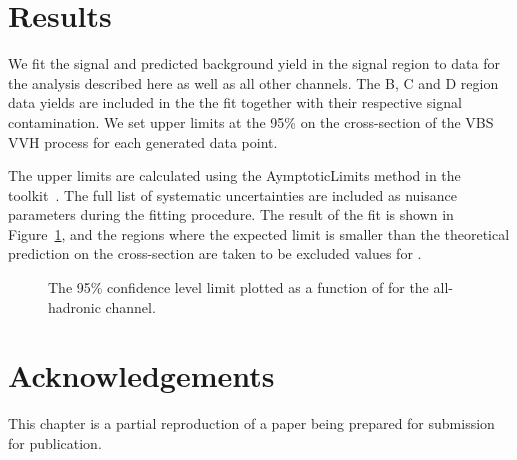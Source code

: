 \section{Results}
We fit the signal and predicted background yield in the signal region to data for the analysis described here as well as all other channels.
The B, C and D region data yields are included in the the fit together with their respective signal contamination.
We set upper limits at the 95\% \CL on the cross-section of the VBS VVH process for each \kVV generated data point.

The upper limits are calculated using the AymptoticLimits method in the \COMBINE toolkit~\cite{CombinePaper}.
The full list of systematic uncertainties are included as nuisance parameters during the fitting procedure.
The result of the fit is shown in Figure~\ref{fig:vbsvvh_limit}, and the regions where the expected limit is smaller than the theoretical prediction on the cross-section are taken to be excluded values for \kVV.

\begin{figure}[htb]
    \centering
    \caption{The 95\% confidence level limit plotted as a function of \kVV for the all-hadronic channel. 
    }
    \label{fig:vbsvvh_limit}
\end{figure}

\section{Acknowledgements}
This chapter is a partial reproduction of a paper being prepared for submission for publication. 
